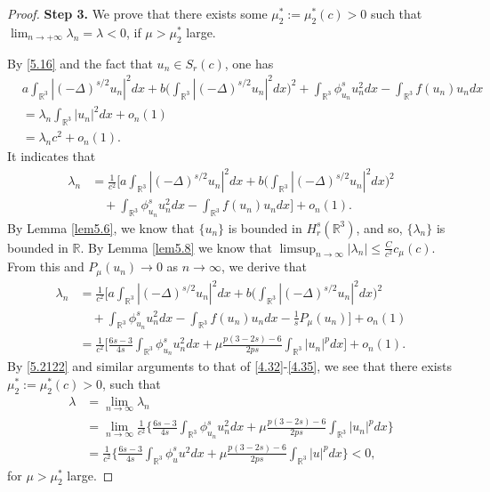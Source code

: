 \documentclass[11pt]{article}
\numberwithin{equation}{section}
\begin{document}
\begin{proof}
\noindent\textbf{Step 3.}
We prove that there exists some $\mu^*_2:=\mu^*_2(c)>0$ such that 
$\lim_{n\to +\infty}\lambda_n=\lambda<0$, if $\mu> \mu^*_2$ large.

By \eqref{5.16} and the fact that $u_n\in S_{r}(c)$, one has
\begin{align*}
&a\int_{\mathbb{R}^3}|(-\Delta)^{s/2}u_n|^2dx
 +b\Big(\int_{\mathbb{R}^3}|(-\Delta)^{s/2}u_n|^2dx\Big)^2
+\int_{\mathbb{R}^3}\phi^s_{u_n} u^2_ndx-\int_{\mathbb{R}^3}f(u_n)u_ndx\\
&= \lambda_n \int_{\mathbb{R}^3}|u_n|^2dx+o_n(1)\\
&= \lambda_n c^2+o_n(1).
\end{align*}
It indicates that
\begin{align*}
\lambda_n
&= \frac{1}{ c^2}\Big[a\int_{\mathbb{R}^3}|(-\Delta)^{s/2}u_n|^2dx
+b\Big(\int_{\mathbb{R}^3}|(-\Delta)^{s/2}u_n|^2dx\Big)^2\\
&\quad +\int_{\mathbb{R}^3}\phi^s_{u_n} u^2_ndx
 -\int_{\mathbb{R}^3}f(u_n)u_ndx\Big]+o_n(1).
\end{align*}
By Lemma \ref{lem5.6}, we  know that $\{u_n\}$ is bounded in $H^s_r(\mathbb{R}^3)$, 
and so, $\{\lambda_n\}$ is bounded in $\mathbb{R}$. 
By Lemma {\ref{lem5.8}} we know that 
$\limsup_{n\to \infty}|\lambda_n|\leq \frac{C}{c^2}c_\mu(c)$. 
From this and  $P_\mu(u_n)\to 0$ as $n\to \infty$, we derive that
\begin{align*}
\lambda_n
&= \frac{1}{ c^2}\Big[a\int_{\mathbb{R}^3}|(-\Delta)^{s/2}u_n|^2dx
 +b\Big(\int_{\mathbb{R}^3}|(-\Delta)^{s/2}u_n|^2dx\Big)^2\\
&\quad +\int_{\mathbb{R}^3}\phi^s_{u_n} u^2_ndx
 -\int_{\mathbb{R}^3}f(u_n)u_ndx-\frac{1}{s}P_\mu(u_n)\Big]+o_n(1)\\
&= \frac{1}{c^2}\Big[\frac{6s-3}{4s}\int_{\mathbb{R}^3}\phi^s_{u_n} u^2_ndx
 +\mu \frac{p(3-2s)-6}{2ps}\int_{\mathbb{R}^3}|u_n|^pdx\Big]+o_n(1).
\end{align*}
By \eqref{5.2122} and similar arguments to that of \eqref{4.32}-\eqref{4.35}, 
we see that there exists $\mu^*_2:=\mu^*_2(c)>0$, such that
\begin{equation}\label{5.212}
\begin{split}
\lambda&= \lim_{n\to \infty}\lambda_n\\
&= \lim_{n\to \infty} \frac{1}{c^2} \Big\{\frac{6s-3}{4s}
 \int_{\mathbb{R}^3}\phi^s_{u_n} u^2_ndx
 +\mu \frac{p(3-2s)-6}{2ps}\int_{\mathbb{R}^3}|u_n|^pdx\Big\}\\
&= \frac{1}{c^2} \Big\{\frac{6s-3}{4s}\int_{\mathbb{R}^3}\phi^s_{u} u^2dx
 +\mu \frac{p(3-2s)-6}{2ps}\int_{\mathbb{R}^3}|u|^pdx\Big\}
< 0,
\end{split}
\end{equation}
for $\mu>\mu^*_2$ large.


\end{proof}
\end{document}
